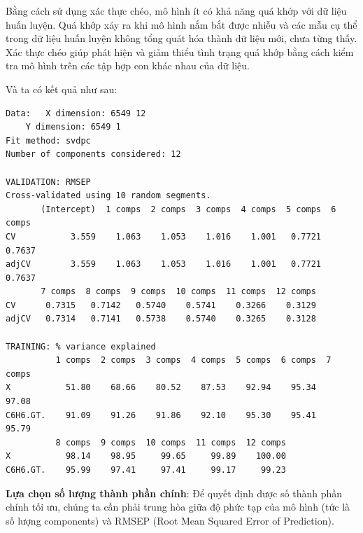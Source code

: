 Bằng cách sử dụng xác thực chéo, mô hình ít có khả năng quá khớp với dữ liệu huấn luyện. Quá khớp xảy ra khi mô hình nắm bắt được nhiễu và các mẫu cụ thể trong dữ liệu huấn luyện không tổng quát hóa thành dữ liệu mới, chưa từng thấy. Xác thực chéo giúp phát hiện và giảm thiểu tình trạng quá khớp bằng cách kiểm tra mô hình trên các tập hợp con khác nhau của dữ liệu.

Và ta có kết quả như sau:
\begin{lstlisting}
Data: 	X dimension: 6549 12 
	Y dimension: 6549 1
Fit method: svdpc
Number of components considered: 12

VALIDATION: RMSEP
Cross-validated using 10 random segments.
       (Intercept)  1 comps  2 comps  3 comps  4 comps  5 comps  6 comps
CV           3.559    1.063    1.053    1.016    1.001   0.7721   0.7637
adjCV        3.559    1.063    1.053    1.016    1.001   0.7721   0.7637
       7 comps  8 comps  9 comps  10 comps  11 comps  12 comps
CV      0.7315   0.7142   0.5740    0.5741    0.3266    0.3129
adjCV   0.7314   0.7141   0.5738    0.5740    0.3265    0.3128

TRAINING: % variance explained
          1 comps  2 comps  3 comps  4 comps  5 comps  6 comps  7 comps
X           51.80    68.66    80.52    87.53    92.94    95.34    97.08
C6H6.GT.    91.09    91.26    91.86    92.10    95.30    95.41    95.79
          8 comps  9 comps  10 comps  11 comps  12 comps
X           98.14    98.95     99.65     99.89    100.00
C6H6.GT.    95.99    97.41     97.41     99.17     99.23
\end{lstlisting}

\textbf{Lựa chọn số lượng thành phần chính}: Để quyết định được số thành phần chính tối ưu, chúng ta cần phải trung hòa giữa độ phức tạp của mô hình (tức là số lượng components) và RMSEP (Root Mean Squared Error of Prediction).

